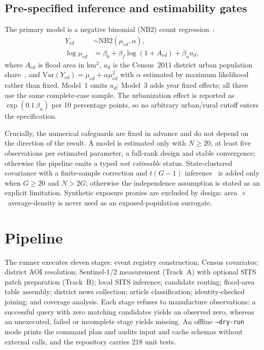 \documentclass[conference]{IEEEtran}
\begin{document}
\subsection{Pre-specified inference and estimability gates}
The primary model is a negative binomial (NB2) count
regression~\cite{hilbe2011}:
\begin{align}
Y_{ed} &\sim \mathrm{NB2}(\mu_{ed}, \alpha),\nonumber\\
\log \mu_{ed} &= \beta_0 + \beta_{f}\log\!\left(1 + A_{ed}\right)
                        + \beta_{u} u_{d},
\end{align}
where $A_{ed}$ is flood area in km$^2$, $u_d$ is the Census~2011 district urban
population share~\cite{census2011}, and $\mathrm{Var}(Y_{ed}) = \mu_{ed} +
\alpha\mu_{ed}^2$ with $\alpha$ estimated by maximum likelihood rather than
fixed. Model~1 omits $u_d$; Model~3 adds year fixed effects; all three use the
same complete-case sample. The urbanization effect is reported as
$\exp(0.1\,\beta_u)$ per 10 percentage points, so no arbitrary urban/rural
cutoff enters the specification.

Crucially, the numerical safeguards are fixed in advance and do not depend on
the direction of the result. A model is estimated only with $N \ge 20$, at least
five observations per estimated parameter, a full-rank design and stable
convergence; otherwise the pipeline emits a typed \emph{not estimable} status.
State-clustered covariance with a finite-sample correction and $t(G-1)$
inference~\cite{cameron2015} is added only when $G \ge 20$ and $N > 2G$;
otherwise the independence assumption is stated as an explicit limitation.
Synthetic exposure proxies are excluded by design: area~$\times$~average-density
is never used as an exposed-population surrogate.

\section{Pipeline}
The runner executes eleven stages: event registry construction; Census
covariates; district AOI resolution; Sentinel-1/2 measurement (Track~A) with
optional SITS patch preparation (Track~B); local SITS inference; candidate
routing; flood-area table assembly; district news collection; article
classification; identity-checked joining; and coverage analysis. Each stage
refuses to manufacture observations: a successful query with zero matching
candidates yields an observed zero, whereas an unexecuted, failed or incomplete
stage yields missing. An offline \texttt{--dry-run} mode prints the command plan
and audits input and cache schemas without external calls, and the repository
carries 218 unit tests.
\end{document}
